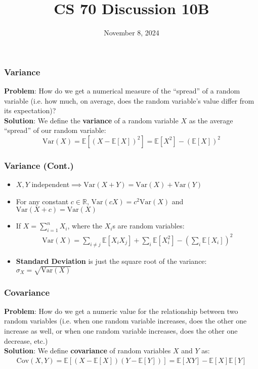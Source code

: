 \documentclass{beamer}
\title{CS 70 Discussion 10B}
\date{November 8, 2024}
\begin{document}
\frame{\titlepage}

\begin{frame}
    \frametitle{Variance}
    {\bf Problem}: How do we get a numerical measure of the ``spread'' of a random variable (i.e. how much, on average, does the random variable's value differ from its expectation)?\\
    {\bf Solution}: We define the {\bf variance} of a random variable $X$ as the average ``spread'' of our random variable:$$\text{Var}(X)=\mathbb{E}\left[(X-\mathbb{E}[X])^2\right]=\mathbb{E}\left[X^2\right]-(\mathbb{E}[X])^2$$
\end{frame}

\begin{frame}
    \frametitle{Variance (Cont.)}
    \begin{itemize}
        \item $X,Y$ independent$\implies\text{Var}(X+Y)=\text{Var}(X)+\text{Var}(Y)$
        \item For any constant $c\in\mathbb{R}$, $\text{Var}(cX)=c^2\text{Var}(X)$ and $\text{Var}(X+c)=\text{Var}(X)$
        \item If $X=\sum_{i=1}^n X_i$, where the $X_i$s are random variables:
        \begin{gather*}
            \text{Var}(X)=\sum_{i\neq j}\mathbb{E}[X_iX_j]+\sum_i\mathbb{E}\left[X_i^2\right]-\left(\sum_i\mathbb{E}[X_i]\right)^2
        \end{gather*}
        \item {\bf Standard Deviation} is just the square root of the variance: $\sigma_X=\sqrt{\text{Var}(X)}$
    \end{itemize}
\end{frame}

\begin{frame}
    \frametitle{Covariance}
    {\bf Problem}: How do we get a numeric value for the relationship between two random variables (i.e. when one random variable increases, does the other one increase as well, or when one random variable increases, does the other one decrease, etc.)\\
    {\bf Solution}: We define {\bf covariance} of random variables $X$ and $Y$ as:
    \begin{gather*}
        \text{Cov}(X,Y)=\mathbb{E}\left[(X-\mathbb{E}[X])(Y-\mathbb{E}[Y])\right]=\mathbb{E}[XY]-\mathbb{E}[X]\mathbb{E}[Y]
    \end{gather*}
\end{frame}
\end{document}
